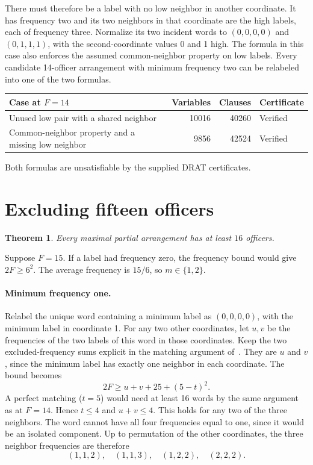 \documentclass[11pt]{article}
\newtheorem{theorem}{Theorem}
\begin{document}
There must therefore be a label with no low neighbor in another
coordinate. It has frequency two and its two neighbors in that
coordinate are the high labels, each of frequency three. Normalize
its two incident words to \((0,0,0,0)\) and \((0,1,1,1)\), with
the second-coordinate values 0 and 1 high. The formula in this
case also enforces the assumed common-neighbor property on low
labels. Every candidate 14-officer arrangement with minimum
frequency two can be relabeled into one of the two formulas.

\begin{center}
\begin{tabular}{lrrl}
Case at \(F=14\) & Variables & Clauses & Certificate\\
\hline
Unused low pair with a shared neighbor & 10016 & 40260 & Verified\\
Common-neighbor property and a missing low neighbor & 9856 & 42524 & Verified
\end{tabular}
\end{center}

Both formulas are unsatisfiable by the supplied DRAT certificates.

\section{Excluding fifteen officers}

\begin{theorem}
Every maximal partial arrangement has at least \(16\) officers.
\end{theorem}

Suppose \(F=15\). If a label had frequency zero, the frequency
bound would give \(2F\ge 6^2\). The average frequency is \(15/6\),
so \(m\in\{1,2\}\).

\paragraph{Minimum frequency one.}
Relabel the unique word containing a minimum label as
\((0,0,0,0)\), with the minimum label in coordinate 1. For any two
other coordinates, let \(u,v\) be the frequencies of the two
labels of this word in those coordinates. Keep the two
excluded-frequency sums explicit in the matching argument
of~\cite[Theorem 2.1]{dgy2}. They are \(u\) and \(v\), since
the minimum label has exactly one neighbor in each coordinate.
The bound becomes
\[
2F\ge u+v+25+(5-t)^2.
\]
A perfect matching (\(t=5\)) would need at least 16 words by the
same argument as at \(F=14\). Hence \(t\le4\) and \(u+v\le4\).
This holds for any two of the three neighbors. The word cannot
have all four frequencies equal to one, since it would be an
isolated component. Up to permutation of the other coordinates,
the three neighbor frequencies are therefore
\[
(1,1,2),\quad(1,1,3),\quad(1,2,2),\quad(2,2,2).
\]
\end{document}
